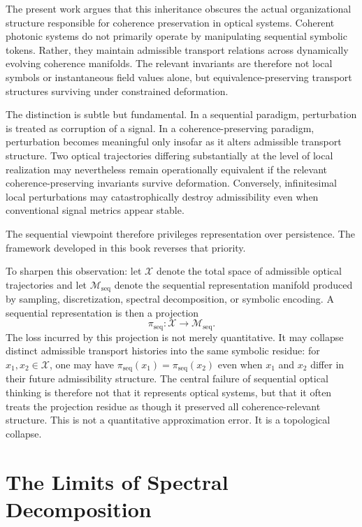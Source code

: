 \documentclass[11pt,openany]{book}
\theoremstyle{definition}
\theoremstyle{plain}
\newcommand{\Mspace}{\mathcal{M}}
\newcommand{\Xspace}{\mathcal{X}}
\begin{document}
The present work argues that this inheritance obscures the actual organizational structure responsible for coherence preservation in optical systems. Coherent photonic systems do not primarily operate by manipulating sequential symbolic tokens. Rather, they maintain admissible transport relations across dynamically evolving coherence manifolds. The relevant invariants are therefore not local symbols or instantaneous field values alone, but equivalence-preserving transport structures surviving under constrained deformation.

The distinction is subtle but fundamental. In a sequential paradigm, perturbation is treated as corruption of a signal. In a coherence-preserving paradigm, perturbation becomes meaningful only insofar as it alters admissible transport structure. Two optical trajectories differing substantially at the level of local realization may nevertheless remain operationally equivalent if the relevant coherence-preserving invariants survive deformation. Conversely, infinitesimal local perturbations may catastrophically destroy admissibility even when conventional signal metrics appear stable.

The sequential viewpoint therefore privileges representation over persistence. The framework developed in this book reverses that priority.

To sharpen this observation: let $\Xspace$ denote the total space of admissible optical trajectories and let $\Mspace_{\mathrm{seq}}$ denote the sequential representation manifold produced by sampling, discretization, spectral decomposition, or symbolic encoding. A sequential representation is then a projection
\[
\pi_{\mathrm{seq}} : \Xspace \to \Mspace_{\mathrm{seq}}.
\]
The loss incurred by this projection is not merely quantitative. It may collapse distinct admissible transport histories into the same symbolic residue: for $x_1, x_2 \in \Xspace$, one may have $\pi_{\mathrm{seq}}(x_1) = \pi_{\mathrm{seq}}(x_2)$ even when $x_1$ and $x_2$ differ in their future admissibility structure. The central failure of sequential optical thinking is therefore not that it represents optical systems, but that it often treats the projection residue as though it preserved all coherence-relevant structure. This is not a quantitative approximation error. It is a topological collapse.

\section{The Limits of Spectral Decomposition}
\end{document}
